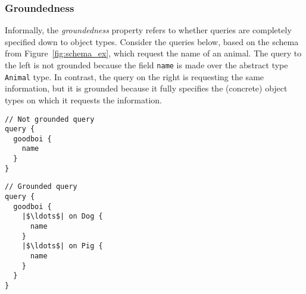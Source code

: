 
\subsubsection*{Groundedness}
Informally, the \textit{groundedness} property refers to whether queries are completely specified down to object types.  Consider the queries below, based on the schema from Figure~\ref{fig:schema_ex}, which request the name of an animal. The query to the left is not grounded because the field \texttt{name} is made over the abstract type \texttt{Animal} type. In contrast, the query on the right is requesting the same information, but it is grounded because it fully specifies the (concrete) object types on which it requests the information.
\begin{minipage}{.25\textwidth}
\begin{verbatim}
// Not grounded query
query {
  goodboi {
    name
  }
}
\end{verbatim}
\end{minipage}%
\begin{minipage}{.25\textwidth}
\begin{verbatim}
// Grounded query
query {
  goodboi {
    |$\ldots$| on Dog {
	  name
    }
    |$\ldots$| on Pig {
      name
    }
  }	
}
\end{verbatim} 
\end{minipage}

